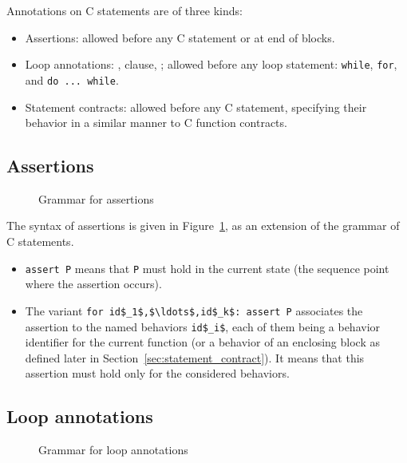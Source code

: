 Annotations on C statements are of three kinds:
\begin{itemize}
\item Assertions: allowed before any C statement or
  at end of blocks.
\item{}
  Loop annotations: \invariant, \assigns clause, \variant; allowed
  before any loop statement: \lstinline|while|, \lstinline|for|, and
  \lstinline|do ... while|.
\item{}
  Statement contracts: allowed before any C statement, specifying
  their behavior in a similar manner to C function contracts.
\end{itemize}

\subsection{Assertions}
\label{sec:assertions}
\begin{figure}[t]
  \begin{cadre}
    
  \end{cadre}
  \caption{Grammar for assertions}
  \label{fig:gram:assertions}
\end{figure}

The syntax of assertions is given in Figure~\ref{fig:gram:assertions},
as an extension of the grammar of C statements.

\begin{itemize}
\item
  \lstinline|assert P|  means that \lstinline|P| must hold in the current state
  (the sequence point where the assertion occurs).

\item The variant \lstinline|for id$_1$,$\ldots$,id$_k$: assert P|
  associates the assertion to the named behaviors \lstinline|id$_i$|, each
  of them being a behavior identifier for the current function (or a
  behavior of an enclosing block as defined later in
  Section~\ref{sec:statement_contract}).  It means that this assertion
  must hold only for the considered behaviors.
\end{itemize}

\subsection{Loop annotations}
\label{sec:loop_annot}

\begin{figure}[t]
  \begin{cadre}
    
  \end{cadre}
  \caption{Grammar for loop annotations}
  \label{fig:gram:loops}
\end{figure}

